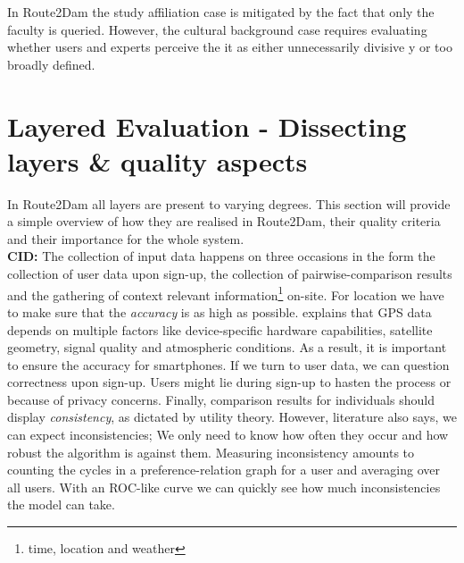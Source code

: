 \documentclass[11pt,a4paper,oneside]{article}
\begin{document}
In Route2Dam the study affiliation case is mitigated by the fact that only the faculty is queried. However, the cultural background case requires evaluating whether users and experts perceive the it as either unnecessarily divisive y or too broadly defined.

\section{Layered Evaluation - Dissecting layers \& quality aspects}
In Route2Dam all layers are present to varying degrees. This section will provide a simple overview of how they are realised in Route2Dam, their quality criteria and their importance for the whole system.\\ 
\textbf{CID:} The collection of input data happens on three occasions in the form the collection of user data upon sign-up, the collection of pairwise-comparison results and the gathering of context relevant information\footnote{time, location and weather} on-site. For location we have to make sure that the \emph{accuracy} is as high as possible. \citeauthor{nationalcoordinationofficeforspace-basedpositioningnavigationandtiming_GPSGovGPS_}\parencite[as cited in]{vandiggelen_WorldFirstGPS_2015} explains that GPS data depends on multiple factors like device-specific hardware capabilities, satellite geometry, signal quality and atmospheric conditions. As a result, it is important to ensure the accuracy for smartphones.\cite{nationalcoordinationofficeforspace-basedpositioningnavigationandtiming_GPSGovGPS_} If we turn to user data, we can question correctness upon sign-up.\cite{staples_Questionnaires_1991} Users might lie during sign-up to hasten the process or because of privacy concerns. Finally, comparison results for individuals should display \emph{consistency}, as dictated by utility theory.\cite{fishburn_TransitiveMeasurableUtility_1983} However, literature also says, we can expect inconsistencies;\cite{hansson_Preferences_2018} We only need to know how often they occur and how robust the algorithm is against them. Measuring inconsistency amounts to counting the cycles in a preference-relation graph for a user and averaging over all users. With an ROC-like curve we can quickly see how much inconsistencies the model can take.\\
\end{document}
